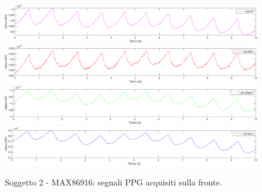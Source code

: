 \begin{figure}[h]
	\centering
	\includegraphics[width=1\linewidth]{ImageFiles/Misure Preliminari/Soggetto 2/max86916/fronte_ired}
	\includegraphics[width=1\linewidth]{ImageFiles/Misure Preliminari/Soggetto 2/max86916/fronte_red}
	\includegraphics[width=1\linewidth]{ImageFiles/Misure Preliminari/Soggetto 2/max86916/fronte_green}
	\includegraphics[width=1\linewidth]{ImageFiles/Misure Preliminari/Soggetto 2/max86916/fronte_blu}
	\caption{Soggetto 2 - MAX86916: segnali PPG acquisiti sulla fronte.}
	\label{fig:soggetto2_MAX86916_fronte}
\end{figure}


\clearpage